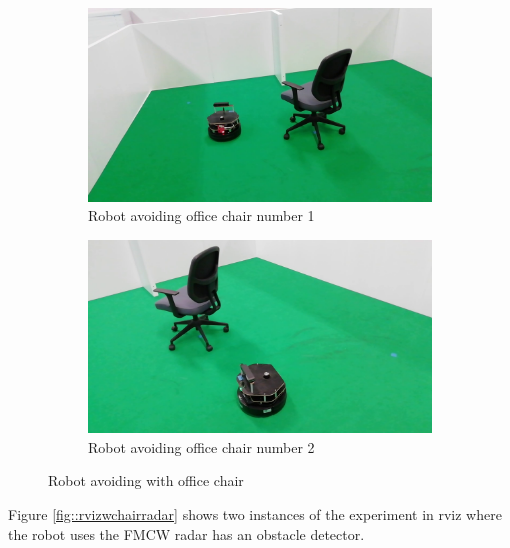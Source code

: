 \begin{figure}[ht!]
  \centering
  \begin{subfigure}[b]{0.49\linewidth}
    \includegraphics[width=\linewidth]{imgs/chapter5/wchairRS.png}
     \caption{Robot avoiding office chair number 1}
     \label{fig::wchairRS1}
  \end{subfigure}
  \begin{subfigure}[b]{0.49\linewidth}
    \includegraphics[width=\linewidth]{imgs/chapter5/wchairRS2.png}
    \caption{Robot avoiding office chair number 2}
    \label{fig::wchairRS2}
  \end{subfigure}
  \caption{Robot avoiding with office chair}
  \label{fig:wchairRS}
\end{figure}

Figure \ref{fig::rvizwchairradar} shows two instances of the experiment in rviz where the robot uses the \ac{FMCW} \ac{radar} has an obstacle detector.

